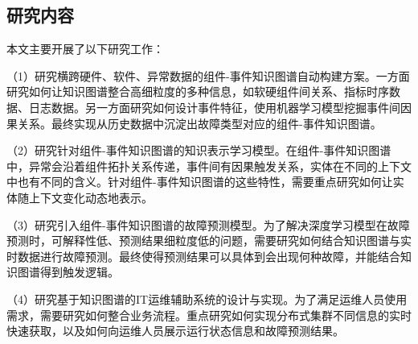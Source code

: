 \subsection{研究内容}
本文主要开展了以下研究工作：

（1）研究横跨硬件、软件、异常数据的组件-事件知识图谱自动构建方案。一方面研究如何让知识图谱整合高细粒度的多种信息，如软硬组件间关系、指标时序数据、日志数据。另一方面研究如何设计事件特征，使用机器学习模型挖掘事件间因果关系。最终实现从历史数据中沉淀出故障类型对应的组件-事件知识图谱。

（2）研究针对组件-事件知识图谱的知识表示学习模型。在组件-事件知识图谱中，异常会沿着组件拓扑关系传递，事件间有因果触发关系，实体在不同的上下文中也有不同的含义。针对组件-事件知识图谱的这些特性，需要重点研究如何让实体随上下文变化动态地表示。

（3）研究引入组件-事件知识图谱的故障预测模型。为了解决深度学习模型在故障预测时，可解释性低、预测结果细粒度低的问题，需要研究如何结合知识图谱与实时数据进行故障预测。最终使得预测结果可以具体到会出现何种故障，并能结合知识图谱得到触发逻辑。

（4）研究基于知识图谱的IT运维辅助系统的设计与实现。为了满足运维人员使用需求，需要研究如何整合业务流程。重点研究如何实现分布式集群不同信息的实时快速获取，以及如何向运维人员展示运行状态信息和故障预测结果。

